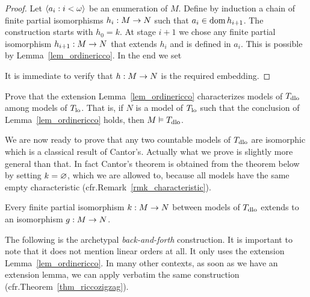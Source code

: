 \documentclass[creche.tex]{subfiles}
\begin{document}
\begin{proof}
Let $\<a_i:i<\omega\>$ be an enumeration of $M$. Define by induction a chain of finite partial isomorphisms $h_i:M\imp N$ such that $a_i\in\dom h_{i+1}$. The construction starts with $h_0=k$. At stage $i+1$ we chose any finite partial isomorphism $h_{i+1}:M\imp N$ that extends $h_i$ and is defined in $a_i$. This is possible by Lemma~\ref{lem_ordinericco}. In the end we set


It is immediate to verify that $h:M\imp N$ is the required embedding.
\end{proof} 


\begin{exercise}\label{ex_ricco->dlo}
Prove that the extension Lemma~\ref{lem_ordinericco} characterizes models of $T_{\rm dlo}$ among models of $T_{\rm lo}$. That is, if $N$ is a model of $T_{\rm lo}$ such that the conclusion of Lemma~\ref{lem_ordinericco} holds, then $M\models  T_{\rm dlo}$.\QED
\end{exercise}


We are now ready to prove that any two countable models of $T_{\rm dlo}$ are isomorphic which is a classical result of Cantor's. Actually what we prove is slightly more general than that. In fact Cantor's theorem is obtained from the theorem below by setting $k=\0$, which we are allowed to, because all models have the same empty characteristic (cfr.\@ Remark~\ref{rmk_characteristic}).

\begin{theorem}\label{zigzagcantor}
Every finite partial isomorphism $k:M\imp N$ between models of $T_{\rm dlo}$ extends to an isomorphism $g:M\imp N$.
\end{theorem}

The following is the archetypal \emph{back-and-forth\/} construction. It is important to note that it does not mention linear orders at all. It only uses the extension Lemma~\ref{lem_ordinericco}. In many other contexts, as soon as we have an extension lemma, we can apply verbatim the same construction (cfr.\@ Theorem~\ref{thm_riccozigzag}).  
\end{document}
